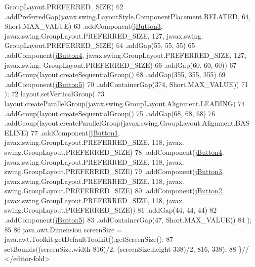 \begin{DoxyCode}
      GroupLayout.PREFERRED\_SIZE)
62                 .addPreferredGap(javax.swing.LayoutStyle.ComponentPlacement.RELATED, 64, Short.MAX\_VALUE)
63                 .addComponent(\mbox{\hyperlink{class_ejemplo2_1_1_colores_adbd4afdc65544ac098b878dc8fec5838}{jButton3}}, javax.swing.GroupLayout.PREFERRED\_SIZE, 127, javax.swing.
      GroupLayout.PREFERRED\_SIZE)
64                 .addGap(55, 55, 55)
65                 .addComponent(\mbox{\hyperlink{class_ejemplo2_1_1_colores_a24dad1da5dc4da01bc9d7de20ac614b5}{jButton4}}, javax.swing.GroupLayout.PREFERRED\_SIZE, 127, javax.swing.
      GroupLayout.PREFERRED\_SIZE)
66                 .addGap(60, 60, 60))
67             .addGroup(layout.createSequentialGroup()
68                 .addGap(355, 355, 355)
69                 .addComponent(\mbox{\hyperlink{class_ejemplo2_1_1_colores_a35c6c2ec6c3ceb50aa3eb4b65558fc0f}{jButton5}})
70                 .addContainerGap(374, Short.MAX\_VALUE))
71         );
72         layout.setVerticalGroup(
73             layout.createParallelGroup(javax.swing.GroupLayout.Alignment.LEADING)
74             .addGroup(layout.createSequentialGroup()
75                 .addGap(68, 68, 68)
76                 .addGroup(layout.createParallelGroup(javax.swing.GroupLayout.Alignment.BASELINE)
77                     .addComponent(\mbox{\hyperlink{class_ejemplo2_1_1_colores_a42bfb6444d7ec536cc713e227d90e1ba}{jButton1}}, javax.swing.GroupLayout.PREFERRED\_SIZE, 118, javax.
      swing.GroupLayout.PREFERRED\_SIZE)
78                     .addComponent(\mbox{\hyperlink{class_ejemplo2_1_1_colores_a24dad1da5dc4da01bc9d7de20ac614b5}{jButton4}}, javax.swing.GroupLayout.PREFERRED\_SIZE, 118, javax.
      swing.GroupLayout.PREFERRED\_SIZE)
79                     .addComponent(\mbox{\hyperlink{class_ejemplo2_1_1_colores_adbd4afdc65544ac098b878dc8fec5838}{jButton3}}, javax.swing.GroupLayout.PREFERRED\_SIZE, 118, javax.
      swing.GroupLayout.PREFERRED\_SIZE)
80                     .addComponent(\mbox{\hyperlink{class_ejemplo2_1_1_colores_a43f88dce24ac914a20f0f77be8e5bebb}{jButton2}}, javax.swing.GroupLayout.PREFERRED\_SIZE, 118, javax.
      swing.GroupLayout.PREFERRED\_SIZE))
81                 .addGap(44, 44, 44)
82                 .addComponent(\mbox{\hyperlink{class_ejemplo2_1_1_colores_a35c6c2ec6c3ceb50aa3eb4b65558fc0f}{jButton5}})
83                 .addContainerGap(47, Short.MAX\_VALUE))
84         );
85  
86         java.awt.Dimension screenSize = java.awt.Toolkit.getDefaultToolkit().getScreenSize();
87         setBounds((screenSize.width-816)/2, (screenSize.height-338)/2, 816, 338);
88     \}\textcolor{comment}{// </editor-fold>                       }
\end{DoxyCode}
\mbox{\label{class_ejemplo2_1_1_colores_ab9e355df5d63821c45cb7fc08541deb3}} 
